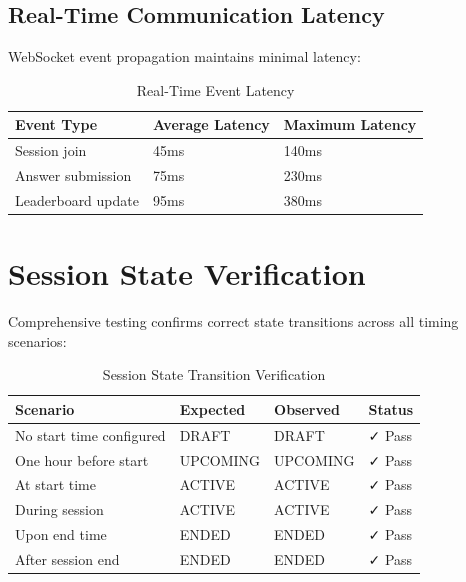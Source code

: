 \documentclass[12pt,a4paper]{report}
\newcommand{\rA}{\rowcolor{white}}
\newcommand{\rB}{\rowcolor{lightgray}}
\newcommand{\rH}{\rowcolor{headcol}}
\begin{document}
\subsection{Real-Time Communication Latency}

WebSocket event propagation maintains minimal latency:

\begin{table}[H]
  \centering
  \small
  \begin{tabular}{|l|l|l|}
    \hline
    \rH \textbf{Event Type} & \textbf{Average Latency} & \textbf{Maximum Latency} \\
    \hline
    \rA Session join & 45ms & 140ms \\
    \hline
    \rB Answer submission & 75ms & 230ms \\
    \hline
    \rA Leaderboard update & 95ms & 380ms \\
    \hline
  \end{tabular}
  \caption{Real-Time Event Latency}
\end{table}

\section{Session State Verification}

Comprehensive testing confirms correct state transitions across all timing scenarios:

\begin{table}[H]
  \centering
  \small
  \begin{tabular}{|l|l|l|l|}
    \hline
    \rH \textbf{Scenario} & \textbf{Expected} & \textbf{Observed} & \textbf{Status} \\
    \hline
    \rA No start time configured & DRAFT & DRAFT & ✓ Pass \\
    \hline
    \rB One hour before start & UPCOMING & UPCOMING & ✓ Pass \\
    \hline
    \rA At start time & ACTIVE & ACTIVE & ✓ Pass \\
    \hline
    \rB During session & ACTIVE & ACTIVE & ✓ Pass \\
    \hline
    \rA Upon end time & ENDED & ENDED & ✓ Pass \\
    \hline
    \rB After session end & ENDED & ENDED & ✓ Pass \\
    \hline
  \end{tabular}
  \caption{Session State Transition Verification}
\end{table}
\end{document}
